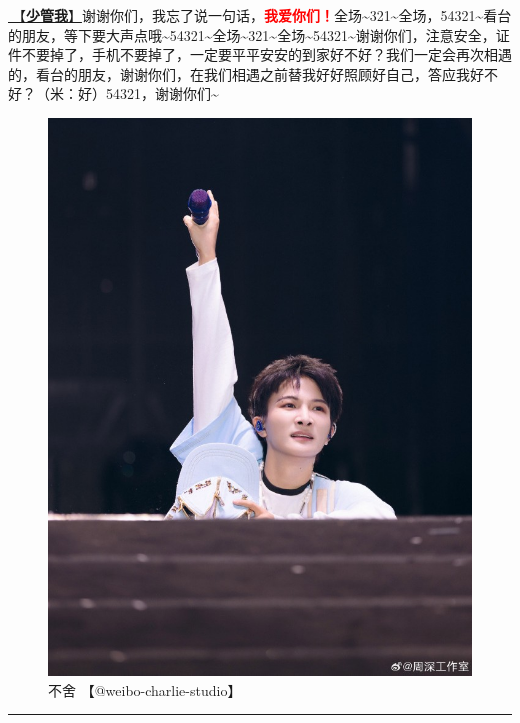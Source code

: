 \documentclass[]{ctexbook}
\begin{document}
\hyperref[watch-ur-manners]{🎵【\textbf{少管我}】}谢谢你们，我忘了说一句话，\textbf{\textcolor{red}{我爱你们！}}全场\textasciitilde321\textasciitilde 全场，54321\textasciitilde 看台的朋友，等下要大声点哦\textasciitilde54321\textasciitilde 全场\textasciitilde321\textasciitilde 全场\textasciitilde54321\textasciitilde 谢谢你们，注意安全，证件不要掉了，手机不要掉了，一定要平平安安的到家好不好？我们一定会再次相遇的，看台的朋友，谢谢你们，在我们相遇之前替我好好照顾好自己，答应我好不好？（米：好）54321，谢谢你们\textasciitilde{}

\begin{figure}

{\centering \includegraphics[width=350pt]{img/beijing20240922/003} 

}

\caption{不舍 【@weibo-charlie-studio】}\label{fig:unnamed-chunk-109}
\end{figure}

\begin{center}\rule{0.5\linewidth}{0.5pt}\end{center}
\end{document}
